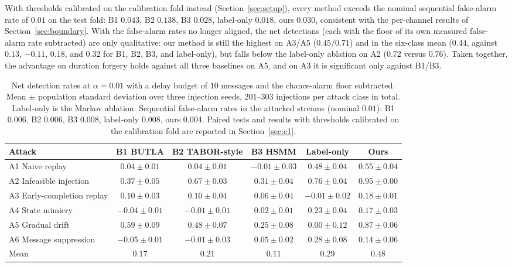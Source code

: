 \documentclass[manuscript,screen,review]{acmart}
\begin{document}
With thresholds calibrated on the calibration fold instead (Section~\ref{sec:setup}), every method exceeds the nominal sequential false-alarm rate of $0.01$ on the test fold: {B1} $0.043$, {B2} $0.138$, {B3} $0.028$, label-only $0.018$, ours $0.030$, consistent with the per-channel results of Section~\ref{sec:boundary}. With the false-alarm rates no longer aligned, the net detections (each with the floor of its own measured false-alarm rate subtracted) are only qualitative: our method is still the highest on {A3}/{A5} ($0.45/0.71$) and in the six-class mean ($0.44$, against $0.13$, $-0.11$, $0.18$, and $0.32$ for {B1}, {B2}, {B3}, and label-only), but falls below the label-only ablation on {A2} ($0.72$ versus $0.76$). Taken together, the advantage on duration forgery holds against all three baselines on {A5}, and on {A3} it is significant only against {B1}/{B3}.

\begin{table}[!t]
\renewcommand{\arraystretch}{1.15}
\caption{Net detection rates at $\alpha=0.01$ with a delay budget of $10$ messages and the chance-alarm floor subtracted. Mean $\pm$ population standard deviation over three injection seeds, $201$--$303$ injections per attack class in total. Label-only is the Markov ablation. Sequential false-alarm rates in the attacked streams (nominal $0.01$): {B1} $0.006$, {B2} $0.006$, {B3} $0.008$, label-only $0.008$, ours $0.004$. Paired tests and results with thresholds calibrated on the calibration fold are reported in Section~\ref{sec:e1}.}
\label{tab:e1}
\centering
\scriptsize
\begin{tabular}{lccccc}
\toprule
Attack & {B1} {BUTLA} & {B2} {TABOR}-style & {B3} {HSMM} & Label-only & Ours \\
\midrule
{A1} Naive replay & $0.04{\pm}0.01$ & $0.04{\pm}0.01$ & $-0.01{\pm}0.03$ & $0.48{\pm}0.04$ & $0.55{\pm}0.04$ \\
{A2} Infeasible injection & $0.37{\pm}0.05$ & $0.67{\pm}0.03$ & $0.31{\pm}0.04$ & $0.76{\pm}0.04$ & $0.95{\pm}0.00$ \\
{A3} Early-completion replay & $0.10{\pm}0.03$ & $0.10{\pm}0.04$ & $0.06{\pm}0.04$ & $-0.01{\pm}0.02$ & $0.18{\pm}0.01$ \\
{A4} State mimicry & $-0.04{\pm}0.01$ & $-0.01{\pm}0.01$ & $0.02{\pm}0.01$ & $0.23{\pm}0.04$ & $0.17{\pm}0.03$ \\
{A5} Gradual drift & $0.59{\pm}0.09$ & $0.48{\pm}0.07$ & $0.25{\pm}0.08$ & $0.00{\pm}0.12$ & $0.87{\pm}0.06$ \\
{A6} Message suppression & $-0.05{\pm}0.01$ & $-0.01{\pm}0.03$ & $0.05{\pm}0.02$ & $0.28{\pm}0.08$ & $0.14{\pm}0.06$ \\
\midrule
Mean & $0.17$ & $0.21$ & $0.11$ & $0.29$ & $0.48$ \\
\bottomrule
\end{tabular}
\end{table}
\end{document}
